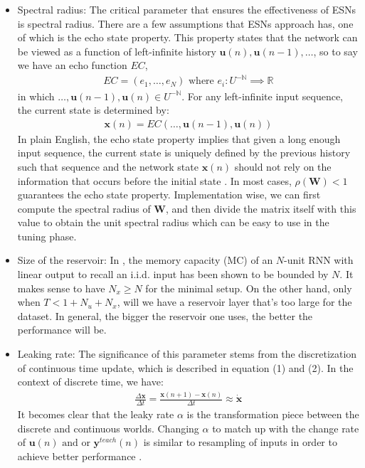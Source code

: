 \documentclass[a4paper,11pt,oneside]{article}
\begin{document}
 \begin{itemize}
 	\item Spectral radius: The critical parameter that ensures the effectiveness of ESNs is spectral radius. There are a few assumptions that ESNs approach has, one of which is the echo state property. This property states that the network can be viewed as a function of left-infinite history $\mathbf{u}(n), \mathbf{u}(n-1), \dots $, so to say we have an echo function $EC$,
 	\begin{align}
 	EC = (e_1, \dots, e_N) \text{ where } e_i : U^{-\mathbb{N}} \implies \mathbb{R} 
 	\end{align}
 	in which $\dots, \mathbf{u}(n-1), \mathbf{u}(n) \in U^{-\mathbb{N}}$. For any left-infinite input sequence, the current state is determined by:
 	\begin{align}
	\mathbf{x}(n) = EC(\dots, \mathbf{u}(n - 1), \mathbf{u}(n))
 	\end{align}
 	In plain English, the echo state property implies that given a long enough input sequence, the current state is uniquely defined by the previous history such that sequence and the network state $\mathbf{x}(n)$ should not rely on the information that occurs before the initial state \cite{jaeger2001echo}. In most cases, $\rho(\mathbf{W}) < 1$ guarantees the echo state property. Implementation wise, we can first compute the spectral radius of $\mathbf{W}$, and then divide the matrix itself with this value to obtain the unit spectral radius which can be easy to use in the tuning phase.
 	
 	\item Size of the reservoir: In \cite{jaeger2001short}, the memory capacity (MC)   of an $N$-unit RNN with linear output to recall an i.i.d. input has been shown to be bounded by $N$. It makes sense to have $N_x \geq N$ for the minimal setup. On the other hand, only when $T < 1 + N_u + N_x$, will we have a reservoir layer that's too large for the dataset. In general, the bigger the reservoir one uses, the better the performance will be. 
 	 	
 	 \item Leaking rate: The significance of this parameter stems from the discretization of continuous time update, which is described in equation (1) and (2). In the context of discrete time, we have:
 	 \begin{align}
 	 \frac{\Delta\mathbf{x}}{\Delta t} = \frac{\mathbf{x}(n+1) - \mathbf{x}(n)}{\Delta t} \approx \dot{\mathbf{x}} 
 	 \end{align}
 	 It becomes clear that the leaky rate $\alpha$ is the transformation piece between the discrete and continuous worlds. Changing $\alpha$ to match up with the change rate of $\mathbf{u}(n) \text{ and or } \mathbf{y}^{teach}(n)$ is similar to resampling of inputs in order to achieve better performance \cite{schrauwen2007introduction}. 
 	 
 \end{itemize}
\end{document}
